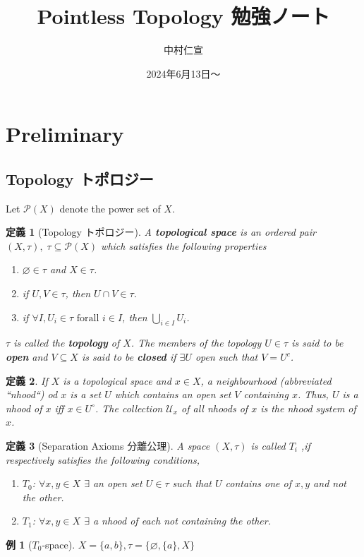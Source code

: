 \documentclass[a4j,12pt]{jarticle}
\numberwithin{equation}{section}
\newtheorem{example}{例}[section]
\newcommand{\itbf}[1]{\textit{\textbf{#1}}}
\newtheorem{dfn}{定義}[section]
\begin{document}
\title{Pointless Topology 勉強ノート}
\date{2024年6月13日〜}
\author{中村仁宣}
\maketitle

\section{Preliminary}
\subsection{Topology トポロジー}
Let $\mathcal{P}(X)$ denote the power set of $X$.
\begin{dfn}[Topology トポロジー]
  A \itbf{topological space} is an ordered pair $(X, \tau), \; \tau \subseteq \mathcal{P}(X)$ which satisfies the following properties
  \begin{enumerate}
  \item $\varnothing \in \tau$ and $X \in \tau$.
  \item if $U,V \in \tau$, then $U \cap V \in \tau$.
  \item if $\forall I, U_i \in \tau \text{ forall } i \in I$, then $\bigcup_{i\in I}U_i$.
  \end{enumerate}
  $\tau$ is called the \itbf{topology} of $X$.
  The members of the topology $U\in\tau$ is said to be \itbf{open} and $V \subseteq X$ is said to be \itbf{closed} if $\exists U$ open such that $V = U^c$.
\end{dfn}
\begin{dfn}
  If $X$ is a topological space and $x \in X$, a neighbourhood (abbreviated ``nhood``) od $x$ is a set $U$ which contains an open set $V$ containing $x$.
  Thus, $U$ is a nhood of $x$ iff $x \in U^{\circ}$.
  The collection $\mathscr{U}_x$ of all nhoods of $x$ is the nhood system of $x$.
\end{dfn}
\begin{dfn}[Separation Axioms 分離公理]
  A space $(X,\tau)$ is called $T_i$ ,if respectively satisfies the following conditions,
  \begin{enumerate}
  \item $T_0$: $\forall x,y \in X$ $\exists$ an open set $U \in \tau$ such that $U$ contains one of $x,y$ and not the other.
  \item $T_1$: $\forall x,y \in X$ $\exists$ a nhood of each not containing the other.
  \end{enumerate}
\end{dfn}
\begin{example}[$T_0$-space]
  $X=\{a,b\}, \tau=\{\varnothing, \{a\}, X\}$
\end{example}
\end{document}
